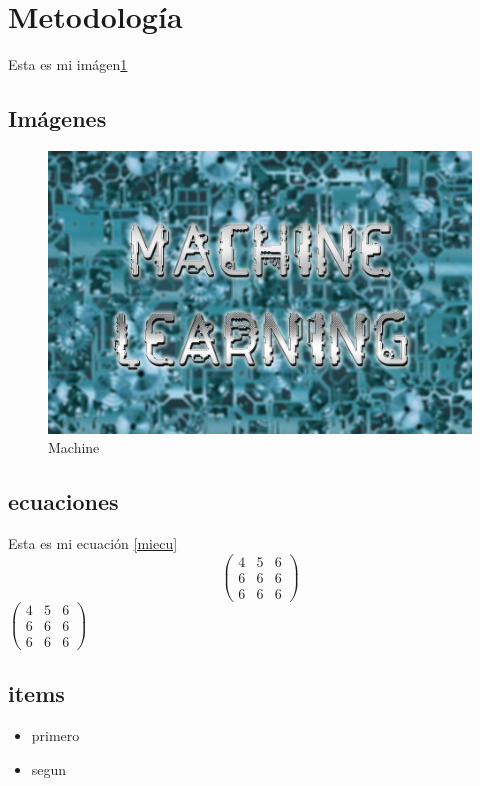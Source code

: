\section{Metodología}

Esta es mi imágen\ref{machinee}
\subsection{Imágenes}
\begin{figure}[H]
    \label{machinee}
    \includegraphics[width=\linewidth]{img/0_jqoZdFC04pJluMGS.jpg}
    \caption{Machine}
\end{figure}

\subsection{ecuaciones}
Esta es mi ecuación \ref{miecu}
\begin{equation} \label{miecu}
    \begin{pmatrix}
        4 & 5 & 6\\ 
        6 & 6 & 6\\ 
        6 & 6 & 6
        \end{pmatrix}
\end{equation}
$\begin{pmatrix}
    4 & 5 & 6\\ 
    6 & 6 & 6\\ 
    6 & 6 & 6
    \end{pmatrix}$


\subsection{items}
\begin{itemize}
    \item primero
    \item segun
  
\end{itemize}
